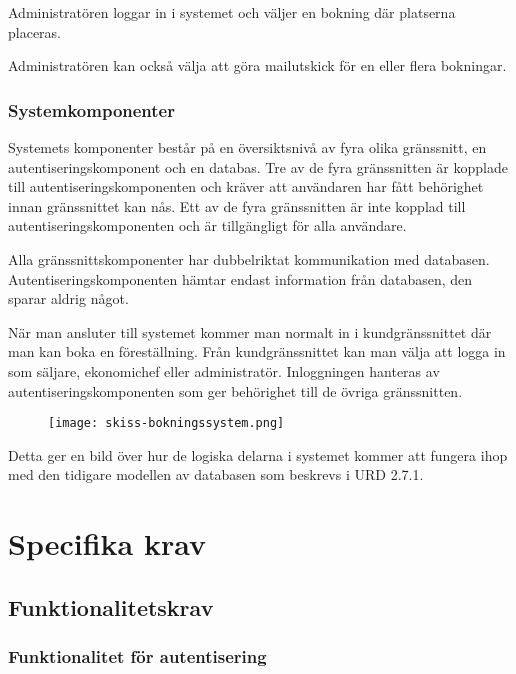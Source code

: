 \documentclass[a4paper, twoside, 11pt, titlepage]{article}
\begin{document}
		Administratören loggar in i systemet och väljer en bokning där platserna placeras.

		Administratören kan också välja att göra mailutskick för en eller flera bokningar.

		\subsubsection{Systemkomponenter}


		Systemets komponenter består på en översiktsnivå av fyra olika gränssnitt, en autentiseringskomponent och en databas. Tre av de fyra gränssnitten är kopplade till autentiseringskomponenten och kräver att användaren har fått behörighet innan gränssnittet kan nås. Ett av de fyra gränssnitten är inte kopplad till autentiseringskomponenten och är tillgängligt för alla användare.

		Alla gränssnittskomponenter har dubbelriktat kommunikation med databasen. Autentiseringskomponenten hämtar endast information från databasen, den sparar aldrig något.

		När man ansluter till systemet kommer man normalt in i kundgränssnittet där man kan boka en föreställning. Från kundgränssnittet kan man välja att logga in som säljare, ekonomichef eller administratör. Inloggningen hanteras av autentiseringskomponenten som ger behörighet till de övriga gränssnitten.

		\begin{figure}[ht] \centering \texttt{[image: skiss-bokningssystem.png]} \end{figure} \FloatBarrier

		Detta ger en bild över hur de logiska delarna i systemet kommer att fungera ihop med den tidigare modellen av databasen som beskrevs i URD 2.7.1.

\clearpage
\section{Specifika krav}



	\subsection{Funktionalitetskrav}



		\subsubsection{Funktionalitet för autentisering}
\end{document}

